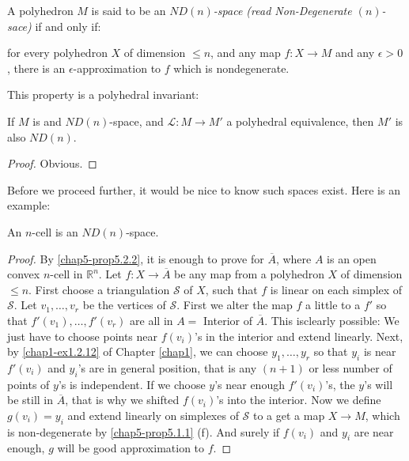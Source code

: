 \begin{definition}\label{chap5-defi5.2.1}
A polyhedron $M$ is said to be an {\em $ND(n)$-space (read Non-Degenerate $(n)$-sace)} if and only if:

for every polyhedron $X$ of dimension $\leq n$, and any map $f:X\to M$ and any $\epsilon>0$, there is an $\epsilon$-approximation to $f$ which is nondegenerate. 
\end{definition}

This property is a polyhedral invariant:

\begin{proposition}\label{chap5-prop5.2.2}
If $M$ is and $ND(n)$-space, and $\mathcal{L}:M\to M'$ a polyhedral equivalence, then $M'$ is also $ND(n)$.
\end{proposition}

\begin{proof}
Obvious.
\end{proof}

Before we proceed further, it would be nice to know such spaces exist. Here is an example:

\begin{proposition}\label{chap5-prop5.2.3}
An $n$-cell is an $ND(n)$-space.
\end{proposition}

\begin{proof}
By \ref{chap5-prop5.2.2}, it is enough to prove for $\overline{A}$, where $A$ is an open convex $n$-cell in $\mathbb{R}^{n}$. Let $f:X\to \overline{A}$ be any map from a polyhedron $X$ of dimension $\leq n$. First choose a triangulation $\mathscr{S}$ of $X$, such that $f$ is linear on each simplex of $\mathscr{S}$. Let $v_{1},\ldots,v_{r}$ be the vertices of $\mathscr{S}$. First we alter the map $f$ a little to a $f'$ so that $f'(v_{1}),\ldots,f'(v_{r})$ are all in $A=$ Interior of $\overline{A}$. This is\pageoriginale clearly possible: We just have to choose points near $f(v_{i})$'s in the interior and extend linearly. Next, by \ref{chap1-ex1.2.12} of Chapter \ref{chap1}, we can choose $y_{1},\ldots,y_{r}$ so that $y_{i}$ is near $f'(v_{i})$ and $y_{i}$'s are in general position, that is any $(n+1)$ or less number of points of $y$'s is independent. If we choose $y$'s near enough $f'(v_{i})$'s, the $y$'s will be still in $\overline{A}$, that is why we shifted $f(v_{i})$'s into the interior. Now we define $g(v_{i})=y_{i}$ and extend linearly on simplexes of $\mathscr{S}$ to a get a map $X\to M$, which is non-degenerate by \ref{chap5-prop5.1.1} (f). And surely if $f(v_{i})$ and $y_{i}$ are near enough, $g$ will be good approximation to $f$.
\end{proof}

